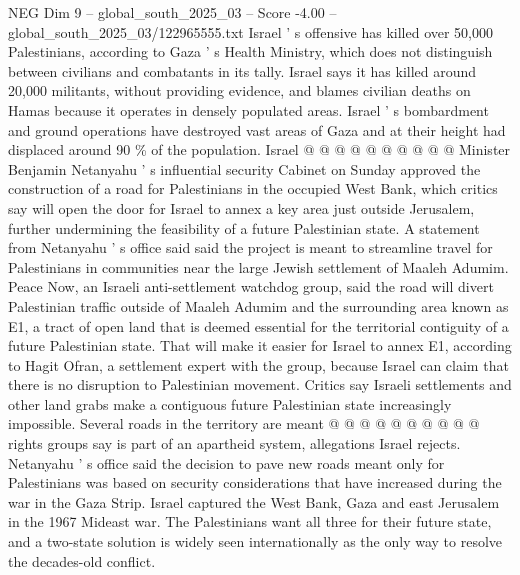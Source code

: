 \begin{textsample}{NEG Dim 9 – global\_south\_2025\_03 – Score -4.00 – global\_south\_2025\_03/122965555.txt}
Israel ' s offensive has killed over 50,000 Palestinians, according to Gaza ' s Health Ministry, which does not distinguish between civilians and combatants in its tally.
Israel says it has killed around 20,000 militants, without providing evidence, and blames civilian deaths on Hamas because it operates in densely populated areas.
Israel ' s bombardment and ground operations have destroyed vast areas of Gaza and at their height had displaced around 90 \% of the population.
Israel @ @ @ @ @ @ @ @ @ @ Minister Benjamin Netanyahu ' s influential security Cabinet on Sunday approved the construction of a road for Palestinians in the occupied West Bank, which critics say will open the door for Israel to annex a key area just outside Jerusalem, further undermining the feasibility of a future Palestinian state.
A statement from Netanyahu ' s office said said the project is meant to streamline travel for Palestinians in communities near the large Jewish settlement of Maaleh Adumim.
Peace Now, an Israeli anti-settlement watchdog group, said the road will divert Palestinian traffic outside of Maaleh Adumim and the surrounding area known as E1, a tract of open land that is deemed essential for the territorial contiguity of a future Palestinian state.
That will make it easier for Israel to annex E1, according to Hagit Ofran, a settlement expert with the group, because Israel can claim that there is no disruption to Palestinian movement.
Critics say Israeli settlements and other land grabs make a contiguous future Palestinian state increasingly impossible.
Several roads in the territory are meant @ @ @ @ @ @ @ @ @ @ rights groups say is part of an apartheid system, allegations Israel rejects.
Netanyahu ' s office said the decision to pave new roads meant only for Palestinians was based on security considerations that have increased during the war in the Gaza Strip.
Israel captured the West Bank, Gaza and east Jerusalem in the 1967 Mideast war.
The Palestinians want all three for their future state, and a two-state solution is widely seen internationally as the only way to resolve the decades-old conflict.

\end{textsample}
